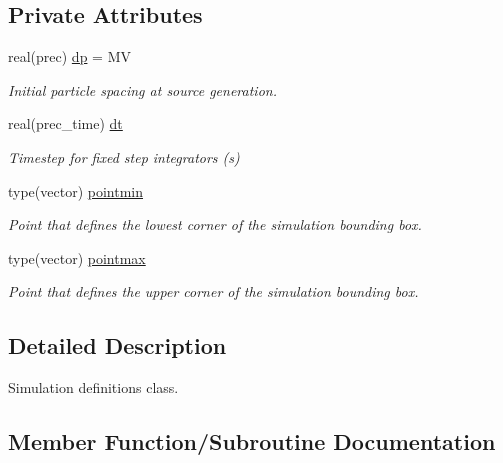\subsection*{Private Attributes}
\begin{DoxyCompactItemize}
\item 
real(prec) \hyperlink{structsimulation__globals_1_1simdefs__t_a416b838aca82edb2df262f5f503a00ae}{dp} = MV
\begin{DoxyCompactList}\small\item\em Initial particle spacing at source generation. \end{DoxyCompactList}\item 
real(prec\+\_\+time) \hyperlink{structsimulation__globals_1_1simdefs__t_a4fc7292599841fe5a63e66e5577d49d2}{dt}
\begin{DoxyCompactList}\small\item\em Timestep for fixed step integrators (s) \end{DoxyCompactList}\item 
type(vector) \hyperlink{structsimulation__globals_1_1simdefs__t_a76b66c4e9d305de6a0c3b8f1bd2ef319}{pointmin}
\begin{DoxyCompactList}\small\item\em Point that defines the lowest corner of the simulation bounding box. \end{DoxyCompactList}\item 
type(vector) \hyperlink{structsimulation__globals_1_1simdefs__t_a8c7a365078a69252312ea200c619bcb6}{pointmax}
\begin{DoxyCompactList}\small\item\em Point that defines the upper corner of the simulation bounding box. \end{DoxyCompactList}\end{DoxyCompactItemize}


\subsection{Detailed Description}
Simulation definitions class. 

\subsection{Member Function/\+Subroutine Documentation}
\mbox{\label{structsimulation__globals_1_1simdefs__t_aade8e069ae929a97a9c78cc52d1078f7}} 
